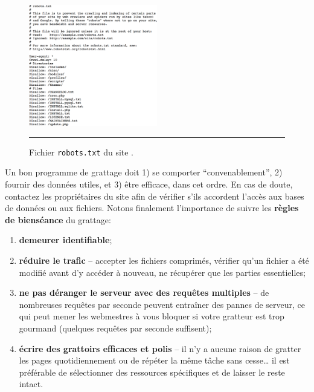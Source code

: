 \begin{figure}[t]
\centering
\includegraphics[width=0.50\textwidth]{Images/CQADS_robots.png}
\caption{Fichier \texttt{robots.txt} du site  .}\hrule\label{fig:robots}
\end{figure}
\afterpage{\FloatBarrier}
\newl Un bon programme de grattage doit 1) se comporter ``convenablement'', 2) fournir des données utiles, et 3) être efficace, dans cet ordre. En cas de doute, contactez les propriétaires du site afin de vérifier s'ils accordent l'accès aux bases de données ou aux fichiers. 
\newpage\noindent Notons finalement l'importance de suivre les \textbf{règles de bienséance} du grattage:
\begin{enumerate}[noitemsep]
    \item \textbf{demeurer identifiable};
    \item \textbf{réduire le trafic} -- accepter les fichiers comprimés, vérifier qu'un fichier a été modifié avant d'y accéder à nouveau, ne récupérer que les parties essentielles;
    \item \textbf{ne pas déranger le serveur avec des requêtes multiples} -- de nombreuses requêtes par seconde peuvent entraîner des pannes de serveur, ce qui peut mener les webmestres à vous bloquer si votre gratteur est trop gourmand (quelques requêtes par seconde suffisent);
    \item \textbf{écrire des grattoirs efficaces et polis} -- il n'y a aucune raison de gratter les pages quotidiennement ou de répéter la même tâche sans cesse… il est préférable de sélectionner des ressources spécifiques et de laisser le reste intact. 
\end{enumerate}
